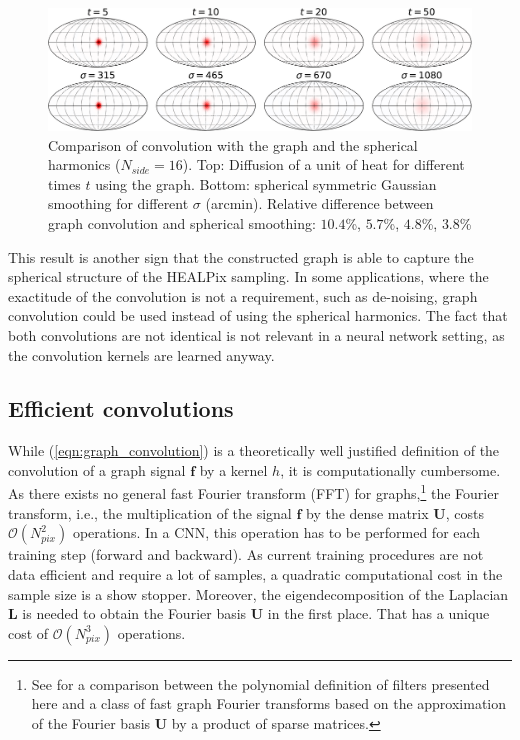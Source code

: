 \documentclass[final,twocolumn,3p,times,authoryear]{elsarticle}
\newcommand{\eqnref}[1]{(\ref{eqn:#1})}
\renewcommand{\b}[1]{{\bm{#1}}}   %
\newcommand{\1}{\b{1}}              %
\newcommand{\0}{\b{0}}              %
\renewcommand{\L}{\b{L}}
\newcommand{\U}{\b{U}}
\newcommand{\f}{\b{f}}
\newcommand{\bO}{\mathcal{O}}
\begin{document}
\begin{figure}
	\centering
	\includegraphics[width=\linewidth]{figures/gaussian_filters_sphere.pdf}
	\caption{Comparison of convolution with the graph and the spherical harmonics ($N_{side} = 16$).
	Top: Diffusion of a unit of heat for different times $t$ using the graph.
	Bottom: spherical symmetric Gaussian smoothing for different $\sigma$ (arcmin).
	Relative difference between graph convolution and spherical smoothing: $10.4$\%, $5.7$\%, $4.8$\%, $3.8$\% }
	\label{fig:gaussian_filters_comparizon}
\end{figure}

This result is another sign that the constructed graph is able to capture the spherical
structure of the HEALPix sampling. In some applications, where the
exactitude of the convolution is not a requirement, such as de-noising, graph convolution could be used instead of using the spherical harmonics.
The fact that both convolutions are not identical is not relevant in a neural network setting, as the convolution kernels are learned anyway.

\subsection{Efficient convolutions}
\label{sec:efficient_convolution}

While \eqnref{graph_convolution} is a theoretically well justified definition of the convolution of a graph signal $\f$ by a kernel $h$, it is computationally cumbersome. As there exists no general fast Fourier transform (FFT) for graphs,\footnote{See \citep{le2018fgft} for a comparison between the polynomial definition of filters presented here and a class of fast graph Fourier transforms based on the approximation of the Fourier basis $\U$ by a product of sparse matrices.} the Fourier transform, i.e., the multiplication of the signal $\f$ by the dense matrix $\U$, costs $\bO(N_{pix}^2)$ operations. In a CNN, this operation has to be performed for each training step (forward and backward). As current training procedures are not data efficient and require a lot of samples, a quadratic computational cost in the sample size is a show stopper.
Moreover, the eigendecomposition of the Laplacian $\L$ is needed to obtain the Fourier basis $\U$ in the first place. That has a unique cost of $\bO(N_{pix}^3)$ operations.
\end{document}
